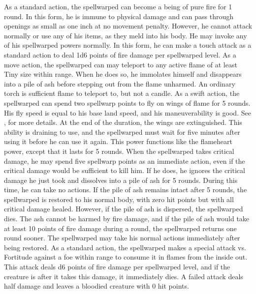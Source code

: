  As a standard action, the spellwarped can become a being of pure fire for 1 round. In this form, he is immune to physical damage and can pass through openings as small as one inch at no movement penalty. However, he cannot attack normally or use any of his items, as they meld into his body. He may invoke any of his spellwarped powers normally. In this form, he can make a touch attack as a standard action to deal 1d6 points of fire damage per spellwarped level.
 As a move action, the spellwarped can may teleport to any active flame of at least Tiny size within \rngmed range. When he does so, he immolates himself and disappears into a pile of ash before stepping out from the flame unharmed. An ordinary torch is sufficient flame to teleport to, but not a candle.
 As a swift action, the spellwarped can spend two spellwarp points to fly on wings of flame for 5 rounds. His fly speed is equal to his base land speed, and his maneuverability is good. See , for more details. At the end of the duration, the wings are extinguished. This ability is draining to use, and the spellwarped must wait for five minutes after using it before he can use it again.
 This power functions like the flameheart power, except that it lasts for 5 rounds.
 When the spellwarped takes critical damage, he may spend five spellwarp points as an immediate action, even if the critical damage would be sufficient to kill him. If he does, he ignores the critical damage he just took and dissolves into a pile of ash for 5 rounds. During this time, he can take no actions. If the pile of ash remains intact after 5 rounds, the spellwarped is restored to his normal body, with zero hit points but with all critical damage healed. However, if the pile of ash is dispersed, the spellwarped dies. The ash cannot be harmed by fire damage, and if the pile of ash would take at least 10 points of fire damage during a round, the spellwarped returns one round sooner. The spellwarped may take his normal actions immediately after being restored.
 As a standard action, the spellwarped makes a special attack vs. Fortitude against a foe within \rngclose range to consume it in flames from the inside out. This attack deals d6 points of fire damage per spellwarped level, and if the creature is \bloodied after it takes this damage, it immediately dies. A failed attack deals half damage and leaves a bloodied creature with 0 hit points.

